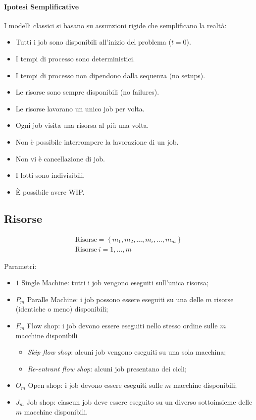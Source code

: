 \paragraph{Ipotesi Semplificative} I modelli classici si basano su assunzioni rigide che semplificano la realtà:
\begin{itemize}
    \item Tutti i job sono disponibili all'inizio del problema ($ t=0 $).
    \item I tempi di processo sono deterministici.
    \item I tempi di processo non dipendono dalla sequenza (no setups).
    \item Le risorse sono sempre disponibili (no failures).
    \item Le risorse lavorano un unico job per volta.
    \item Ogni job visita una risorsa al più una volta.
    \item Non è possibile interrompere la lavorazione di un job.
    \item Non vi è cancellazione di job.
    \item I lotti sono indivisibili.
    \item È possibile avere WIP.
\end{itemize}

%
\subsection{Risorse}

\begin{gather*}
    \text{Risorse} = \left\{ m_{1},m_{2}, \dots, m_{i}, \dots, m_{m} \right\} \\
    \text{Risorse}~i = 1, \dots, m
\end{gather*}

Parametri:
\begin{itemize}
    \item $ 1 $ Single Machine: tutti i job vengono eseguiti sull'unica risorsa;
    \item $ P_{m} $ Paralle Machine: i job possono essere eseguiti su una delle $ m $ risorse (identiche o meno) disponibili;
    \item $ F_{m} $ Flow shop: i job devono essere eseguiti nello stesso ordine sulle $ m $ macchine disponibili
          \begin{itemize}
              \item \emph{Skip flow shop}: alcuni job vengono eseguiti su una sola macchina;
              \item \emph{Re-entrant flow shop}: alcuni job presentano dei cicli;
          \end{itemize}
    \item $ O_{m} $ Open shop: i job devono essere eseguiti sulle $ m $ macchine disponibili;
    \item $ J_{m} $ Job shop: ciascun job deve essere eseguito su un diverso sottoinsieme delle $ m $ macchine disponibili.
\end{itemize}


